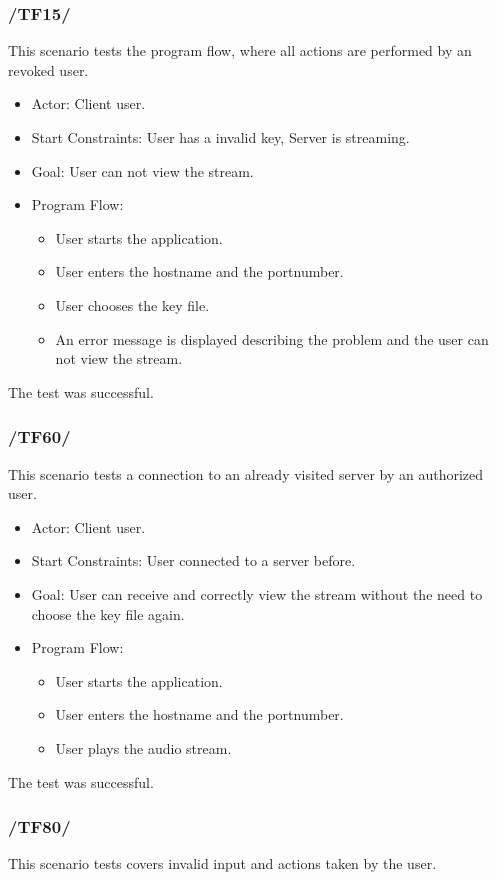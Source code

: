 \documentclass[a4paper,10pt]{scrartcl}
\begin{document}
\subsubsection{/TF15/}
This scenario tests the program flow, where all actions are performed by an revoked user.

\begin{itemize}
	\item Actor: Client user.
	\item Start Constraints: User has a invalid key, Server is streaming.
	\item Goal: User can not view the stream.
	\item Program Flow:
	\begin{itemize}
   \item User starts the application.
   \item User enters the hostname and the portnumber.
   \item User chooses the key file.
   \item An error message is displayed describing the problem and the user can not view the stream.
\end{itemize}
\end{itemize}
The test was successful.

\subsubsection{/TF60/}
This scenario tests a connection to an already visited server by an authorized user.

\begin{itemize}
	\item Actor: Client user.
	\item Start Constraints: User connected to a server before.
	\item Goal: User can receive and correctly view the stream without the need to choose the key file again.
	\item Program Flow:
	\begin{itemize}
   \item User starts the application.
   \item User enters the hostname and the portnumber.
   \item User plays the audio stream.
\end{itemize}
\end{itemize}
The test was successful.
\newpage

\subsubsection{/TF80/}
This scenario tests covers invalid input and actions taken by the user.
\end{document}
